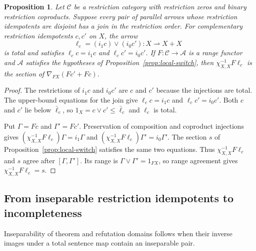 \documentclass[11pt]{article}
\newtheorem{proposition}[theorem]{Proposition}
\begin{document}
\begin{proposition}\label{prop:disjoint-joins}
Let $\mathcal C$ be a restriction category with restriction zeros and
binary restriction coproducts. Suppose every pair of parallel arrows
whose restriction idempotents are disjoint has a join in the restriction
order.
For complementary restriction idempotents $c,c'$ on $X$, the arrow
\[
 \ell_c=(i_1c)\vee(i_0c'):X\rightharpoonup X+X
\]
is total and satisfies $\ell_cc=i_1c$ and $\ell_cc'=i_0c'$.
If $F:\mathcal C\to\mathcal A$ is a range functor and $\mathcal A$
satisfies the hypotheses of Proposition~\ref{prop:local-switch},
then $\chi_{X,X}^{-1}F\ell_c$ is the section of
$\nabla_{FX}(Fc'+Fc)$.
\end{proposition}
\begin{proof}
The restrictions of $i_1c$ and $i_0c'$ are $c$ and $c'$ because
the injections are total. The upper-bound equations for the join
give $\ell_cc=i_1c$ and $\ell_cc'=i_0c'$.
Both $c$ and $c'$ lie below $\bar\ell_c$, so
$1_X=c\vee c'\le\bar\ell_c$ and $\ell_c$ is total.

Put $\Gamma=Fc$ and $\Gamma'=Fc'$. Preservation of composition
and coproduct injections gives
$(\chi_{X,X}^{-1}F\ell_c)\Gamma=i_1\Gamma$ and
$(\chi_{X,X}^{-1}F\ell_c)\Gamma'=i_0\Gamma'$.
The section $s$ of Proposition~\ref{prop:local-switch} satisfies the
same two equations. Thus $\chi_{X,X}^{-1}F\ell_c$ and $s$ agree after
$[\Gamma,\Gamma']$. Its range is
$\Gamma\vee\Gamma'=1_{FX}$, so range agreement gives
$\chi_{X,X}^{-1}F\ell_c=s$.
\end{proof}

\subsection{From inseparable restriction idempotents to incompleteness}

Inseparability of theorem and refutation domains follows when their
inverse images under a total sentence map contain an inseparable pair.
\end{document}
